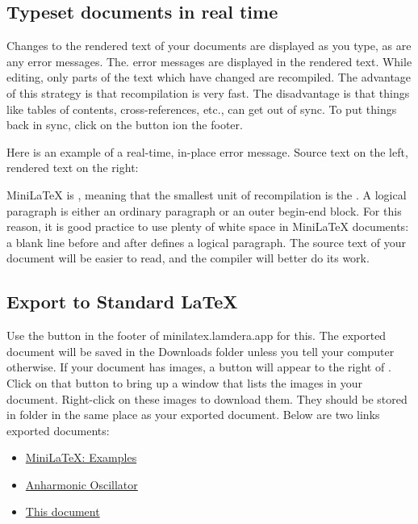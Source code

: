 
\subsection{Typeset documents in real time}

Changes to the rendered text of your documents are displayed as you type, as are any error messages.  The. error messages are displayed in the rendered text.  While editing, only parts of the text which have changed are recompiled.  The advantage of this strategy  is that recompilation is very fast.  The disadvantage is that things like tables of contents, cross-references, etc., can get out of sync.  To put things back in sync, click on the  button ion the footer.

Here is an example of a real-time, in-place error message.  Source text on the left, rendered text on the right:


 MiniLaTeX is , meaning that the smallest unit of recompilation is the .  A logical paragraph is either an ordinary paragraph or an outer begin-end block.  For this reason, it is good practice to use plenty of white space in MiniLaTeX documents: a blank line before and after defines a logical paragraph.  The source text of your document will be easier to read, and the compiler will better do its work.

\subsection{Export to Standard LaTeX}

Use the  button in the footer of minilatex.lamdera.app for this.  The exported document will be saved in the Downloads folder unless you tell your computer otherwise.  If your document has images, a button  will appear to the right of .  Click on that button to bring up a window that lists the images in your document.  Right-click on these images to download them.  They should be stored in folder  in the same place as your exported document.  Below are two links  exported documents:


\begin{itemize}


\item \href{https://noteimages.s3.amazonaws.com/Minilatex__Examples.pdf}{MiniLaTeX: Examples}

\item \href{https://noteimages.s3.amazonaws.com/anharmonic_oscillator.pdf}{Anharmonic Oscillator}

\item \href{https://noteimages.s3.amazonaws.com/TUG_Talk_July_2020.pdf}{This document}

\end{itemize}


